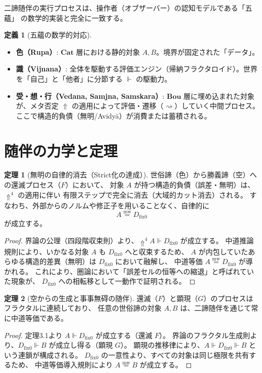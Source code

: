 \documentclass[11pt,a4paper]{article}
\theoremstyle{definition}
\newtheorem{definition}{定義}[section]
\newtheorem{theorem}{定理}[section]
\newcommand{\dfix}{D_{\mathrm{fix}0}} %
\newcommand{\mweq}{\mathrel{\overset{\mathrm{mw}}{=}}}
\newcommand{\metanegation}{\Uparrow}
\newcommand{\aletheiai}{\Vdash} %
\newcommand{\Bou}{\mathbf{Bou}}
\newcommand{\Cat}{\mathbf{Cat}}
\newcommand{\Leadsto}{\rightsquigarrow}
\begin{document}
二諦随伴の実行プロセスは、操作者（オブザーバー）の認知モデルである「五蘊」
の数学的実装と完全に一致する。

\begin{definition}[五蘊の数学的対応]
\begin{itemize}
    \item \textbf{色（Rupa）}: $\Cat$ 層における静的対象 $A, B$。境界が固定された「データ」。
    \item \textbf{識（Vijnana）}: 全体を駆動する評価エンジン（帰納フラクタロイド）。世界を「自己」と「他者」に分節する $\aletheiai$ の駆動力。
    \item \textbf{受・想・行（Vedana, Samjna, Samskara）}: $\Bou$ 層に埋め込まれた対象が、メタ否定 $\metanegation$ の適用によって評価・遷移（$\Leadsto$）していく中間プロセス。ここで構造的負債（無明/Avidyā）が消費または蓄積される。
\end{itemize}
\end{definition}

\section{随伴の力学と定理}

\begin{theorem}[無明の自律的消去（Strict化の達成）]
世俗諦（色）から勝義諦（空）への還滅プロセス（$F$）において、
対象 $A$ が持つ構造的負債（誤差・無明）は、$\metanegation^4$ の適用に伴い
有限ステップで完全に消去（大域的カット消去）される。
すなわち、外部からのノルムや修正子を用いることなく、自律的に
$$A \mweq \dfix$$
が成立する。
\end{theorem}
\begin{proof}
界論の公理（四段階収束則）より、$\metanegation^4 A \aletheiai \dfix$ が成立する。
中道推論規則により、いかなる対象 $A$ も $\dfix$ へと収束するため、
$A$ が内包していたあらゆる構造的差異（無明）は $\dfix$ において融解し、
中道等価 $A \mweq \dfix$ が導かれる。
これにより、圏論において「誤差セルの恒等への縮退」と呼ばれていた現象が、
$\dfix$ への相転移として一動作で証明される。
\end{proof}

\begin{theorem}[空からの生成と事事無碍の随伴]
還滅（$F$）と顕現（$G$）のプロセスはフラクタルに連続しており、
任意の世俗諦の対象 $A, B$ は、二諦随伴を通じて常に中道等価である。
\end{theorem}
\begin{proof}
定理3.1より $A \aletheiai \dfix$ が成立する（還滅 $F$）。
界論のフラクタル生成則より、$\dfix \aletheiai B$ が成立し得る（顕現 $G$）。
顕現の推移律により、$A \aletheiai \dfix \aletheiai B$ という連鎖が構成される。
$\dfix$ の一意性より、すべての対象は同じ極限を共有するため、
中道等価導入規則により $A \mweq B$ が成立する。
\end{proof}
\end{document}
